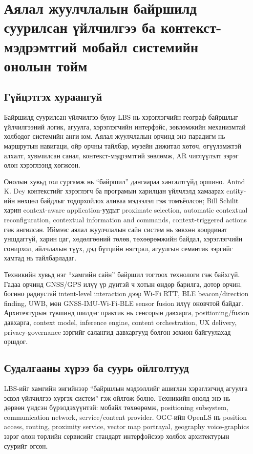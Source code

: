 \chapter*{Аялал жуулчлалын байршилд суурилсан үйлчилгээ ба контекст-мэдрэмтгий мобайл системийн онолын тойм}
\begin{sloppy}

\section*{Гүйцэтгэх хураангуй}
Байршилд суурилсан үйлчилгээ буюу LBS нь хэрэглэгчийн географ байршлыг үйлчилгээний логик, агуулга, хэрэглэгчийн интерфэйс, зөвлөмжийн механизмтай холбодог системийн анги юм. Аялал жуулчлалын орчинд энэ парадигм нь маршрутын навигаци, ойр орчны тайлбар, музейн дижитал хөтөч, өгүүлэмжтэй алхалт, хувьчилсан санал, контекст-мэдрэмтгий зөвлөмж, AR чиглүүлэлт зэрэг олон хэрэглээнд хөгжсөн.

Онолын хувьд гол сургамж нь ``байршил'' дангаараа хангалтгүйд оршино. Anind K. Dey контекстийг хэрэглэгч ба програмын харилцан үйлчлэлд хамаарах entity-ийн нөхцөл байдлыг тодорхойлох аливаа мэдээлэл гэж томъёолсон; Bill Schilit харин context-aware application-уудыг proximate selection, automatic contextual reconfiguration, contextual information and commands, context-triggered actions гэж ангилсан. Иймээс аялал жуулчлалын сайн систем нь зөвхөн координат уншдаггүй, харин цаг, хөдөлгөөний төлөв, төхөөрөмжийн байдал, хэрэглэгчийн сонирхол, айлчлалын түүх, дэд бүтцийн нягтрал, агуулгын семантик зэргийг хамтад нь тайлбарладаг.

Техникийн хувьд нэг ``хамгийн сайн'' байршил тогтоох технологи гэж байхгүй. Гадаа орчинд GNSS/GPS илүү үр дүнтэй ч хотын өндөр барилга, дотор орчин, богино радиустай intent-level interaction дээр Wi-Fi RTT, BLE beacon/direction finding, UWB, мөн GNSS-IMU-Wi-Fi-BLE sensor fusion илүү оновчтой байдаг. Архитектурын түвшинд шилдэг практик нь сенсорын давхарга, positioning/fusion давхарга, context model, inference engine, content orchestration, UX delivery, privacy-governance зэргийг салангид давхаргууд болгон зохион байгуулахад оршдог.

\section*{Судалгааны хүрээ ба суурь ойлголтууд}
LBS-ийг хамгийн энгийнээр ``байршлын мэдээллийг ашиглан хэрэглэгчид агуулга эсвэл үйлчилгээ хүргэх систем'' гэж ойлгож болно. Техникийн онолд энэ нь дөрвөн үндсэн бүрэлдэхүүнтэй: мобайл төхөөрөмж, positioning subsystem, communication network, service/content provider. OGC-ийн OpenLS нь position access, routing, proximity service, vector map portrayal, geography voice-graphics зэрэг олон төрлийн сервисийг стандарт интерфэйсээр холбох архитектурын суурийг өгсөн.


\end{sloppy}
